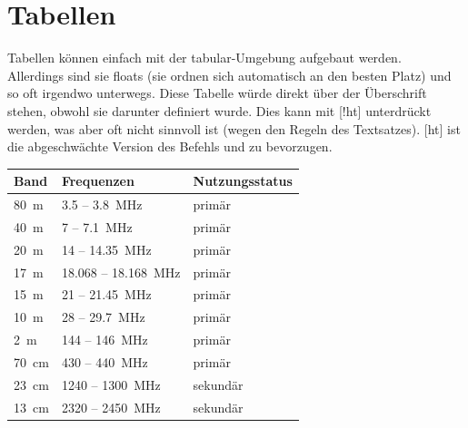 \newpage
\section{Tabellen}

Tabellen können einfach mit der tabular-Umgebung aufgebaut werden.\\
Allerdings sind sie floats (sie ordnen sich automatisch an den besten Platz) und so oft irgendwo unterwegs. Diese Tabelle würde direkt über der Überschrift stehen, obwohl sie darunter definiert wurde. Dies kann mit [!ht] unterdrückt werden, was aber oft nicht sinnvoll ist (wegen den Regeln des Textsatzes). [ht] ist die abgeschwächte Version des Befehls und zu bevorzugen.

	\begin{table}[ht]
		\centering
			\begin{tabular}{| l | l | l |} %
					\hline Band & Frequenzen & Nutzungsstatus \\ \hline %
					\SI{80}{m} 	& \num{3,5} -- \SI{3,8}{MHz} 		& primär\\
					\SI{40}{m} 	& \num{7} -- \SI{7,1}{MHz} 			& primär\\
					\SI{20}{m} 	& \num{14} -- \SI{14,35}{MHz}		& primär \\
					\SI{17}{m} 	& \num{18,068} -- \SI{18,168}{MHz} 	& primär\\
					\SI{15}{m} 	& \num{21} -- \SI{21,45}{MHz} 		& primär\\
					\SI{10}{m} 	& \num{28} -- \SI{29,7}{MHz} 		& primär\\
					\SI{2}{m}	& \num{144} -- \SI{146}{MHz} 		& primär\\
					\SI{70}{cm}	& \num{430} -- \SI{440}{MHz}		& primär\\
					\SI{23}{cm}	& \num{1240} -- \SI{1300}{MHz} 		& sekundär\\
					\SI{13}{cm}	& \num{2320} -- \SI{2450}{MHz} 		& sekundär\\
					\hline
			\end{tabular} 
		\label{tab:Bandauswahl}
	\end{table}